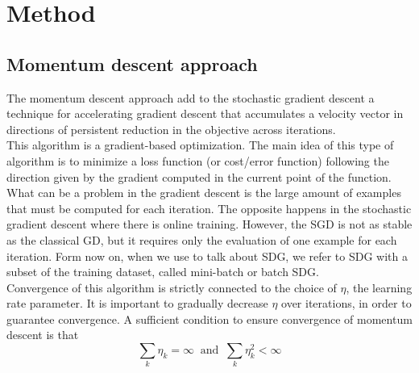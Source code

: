 \section{Method}

\subsection{Momentum descent approach}
The momentum descent approach add to the stochastic gradient descent a technique for accelerating gradient descent that accumulates a velocity vector in directions of persistent reduction in the objective across iterations. 
\\
This algorithm is a gradient-based optimization. The main idea of this type of algorithm is to minimize a loss function (or cost/error function) following the direction given by the gradient computed in the current point of the function.
\\
What can be a problem in the gradient descent is the large amount of examples that must be computed for each iteration. The opposite happens in the stochastic gradient descent where there is online training. However, the SGD is not as stable as the classical GD, but it requires only the evaluation of one example for each iteration. 
Form now on, when we use to talk about SDG, we refer to SDG with a subset of the training dataset, called mini-batch or batch SDG.
\\
Convergence of this algorithm is strictly connected to the choice of $\eta$, the learning rate parameter. It is important to gradually decrease $\eta$ over iterations, in order to guarantee convergence. A sufficient condition to ensure convergence of momentum descent is that 
\begin{equation}
\label{assumption:momentum_descent}
\sum_k \eta_k=\infty \  \text{ and } \ \sum_k \eta_k^2 < \infty
\end{equation}


